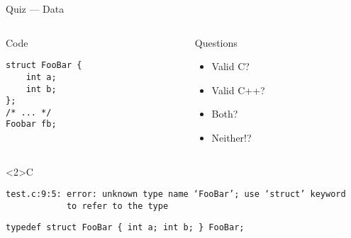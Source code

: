 \documentclass[presentation,aspectratio=169]{beamer}
\begin{document}

\begin{frame}[fragile,label={sec:org1921130}]{Quiz — Data}
 \begin{columns}
\begin{column}{0.48\columnwidth}
\begin{block}{Code}
\begin{verbatim}
struct FooBar {
    int a;
    int b;
};
/* ... */
Foobar fb;
\end{verbatim}
\end{block}
\end{column}

\begin{column}{0.48\columnwidth}
\begin{block}{Questions}
\begin{itemize}
\item Valid C?
\item Valid C++?
\item Both?
\item Neither!?
\end{itemize}

\vspace{0.5cm}
\end{block}
\end{column}
\end{columns}
\begin{block}<2>{C}
\begin{verbatim}
test.c:9:5: error: unknown type name ‘FooBar’; use ‘struct’ keyword
            to refer to the type
\end{verbatim}

\begin{verbatim}
typedef struct FooBar { int a; int b; } FooBar;
\end{verbatim}
\end{block}
\end{frame}


\end{document}
